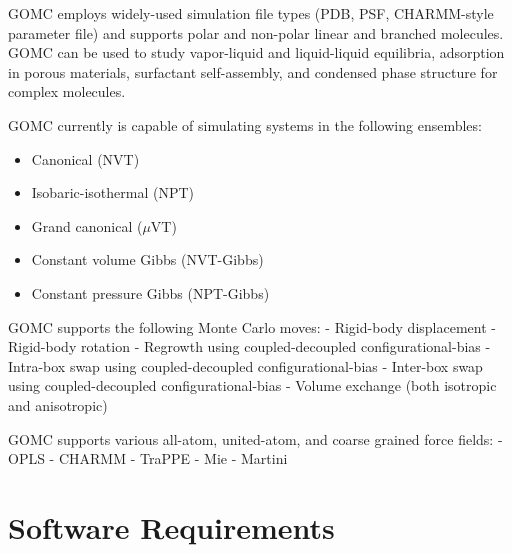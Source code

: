 \documentclass[letterpaper,10pt,english]{sphinxmanual}
\begin{document}
GOMC employs widely-used simulation file types (PDB, PSF, CHARMM-style parameter file) and supports polar and non-polar linear and branched molecules. GOMC can be used to study vapor-liquid and liquid-liquid equilibria, adsorption in porous materials, surfactant self-assembly, and condensed phase structure for complex molecules.

GOMC currently is capable of simulating systems in the following ensembles:
\begin{itemize}
\item {} 
Canonical (NVT)

\item {} 
Isobaric-isothermal (NPT)

\item {} 
Grand canonical (\(\mu\)VT)

\item {} 
Constant volume Gibbs (NVT-Gibbs)

\item {} 
Constant pressure Gibbs (NPT-Gibbs)

\end{itemize}

GOMC supports the following Monte Carlo moves:
- Rigid-body displacement
- Rigid-body rotation
- Regrowth using coupled-decoupled configurational-bias
- Intra-box swap using coupled-decoupled configurational-bias
- Inter-box swap using coupled-decoupled configurational-bias
- Volume exchange (both isotropic and anisotropic)

GOMC supports various all-atom, united-atom, and coarse grained force fields:
- OPLS
- CHARMM
- TraPPE
- Mie
- Martini


\chapter{Software Requirements}
\label{\detokenize{software_requirements:software-requirements}}\label{\detokenize{software_requirements::doc}}
\end{document}
